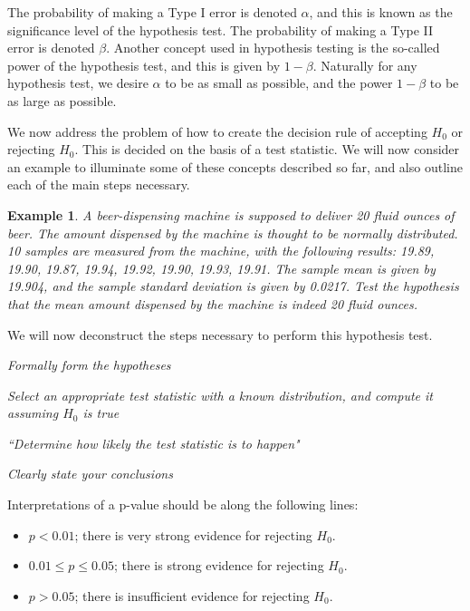 \documentclass[12pt]{article}
\theoremstyle{break}
\newtheorem{example}[theorem]{Example}
\begin{document}
The probability of making a Type I error is denoted $\alpha$, and this is known as the significance level of the hypothesis test. The probability of making a Type II error is denoted $\beta$. Another concept used in hypothesis testing is the so-called power of the hypothesis test, and this is given by $1-\beta$. Naturally for any hypothesis test, we desire $\alpha$ to be as small as possible, and the power $1-\beta$ to be as large as possible.

We now address the problem of how to create the decision rule of accepting $H_0$ or rejecting $H_0$. This is decided on the basis of a test statistic. We will now consider an example to illuminate some of these concepts described so far, and also outline each of the main steps necessary.

\begin{example}
A beer-dispensing machine is supposed to deliver 20 fluid ounces of beer. The amount dispensed by the machine is thought to be normally distributed. 10 samples are measured from the machine, with the following results: 19.89, 19.90, 19.87, 19.94, 19.92, 19.90, 19.93, 19.91. The sample mean is given by 19.904, and the sample standard deviation is given by 0.0217. Test the hypothesis that the mean amount dispensed by the machine is indeed 20 fluid ounces.
\end{example}

We will now deconstruct the steps necessary to perform this hypothesis test.

\begin{mdframed}
\it{Formally form the hypotheses}
\textcolor[rgb]{1.00,1.00,1.00}{\lipsum[1]}
\end{mdframed}

\begin{mdframed}
\it{Select an appropriate test statistic with a known distribution, and compute it assuming $H_0$ is true}
\textcolor[rgb]{1.00,1.00,1.00}{\lipsum[1]}
\end{mdframed}

\begin{mdframed}
\it{``Determine how likely the test statistic is to happen"}
\textcolor[rgb]{1.00,1.00,1.00}{\lipsum[1-6]}
\end{mdframed}

\begin{mdframed}
\it{Clearly state your conclusions}
\textcolor[rgb]{1.00,1.00,1.00}{\lipsum[1]}
\end{mdframed}

Interpretations of a
p-value should be along the following
lines:
\begin{itemize}
\item $p < 0.01$; there is very strong evidence
for rejecting $H_{0}$.
\item $0.01 \leq p \leq 0.05$; there is strong evidence
for rejecting $H_0$.
\item $p > 0.05$; there is insufficient evidence
for rejecting $H_0$.
\end{itemize}
\end{document}
